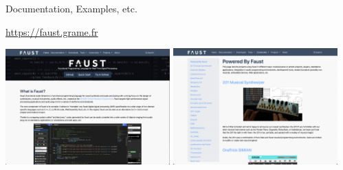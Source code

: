 
\begin{frame}[fragile]{Documentation, Examples, etc.}
    
    {\href{https://faust.grame.fr}{https://faust.grame.fr}}

    \begin{center}
        \href{https://faust.grame.fr}{\includegraphics[width=0.475\textwidth]{images/faust-website.png}}
        \href{https://faust.grame.fr/community/powered-by-faust/}{\includegraphics[width=0.475\textwidth]{images/powered-with-faust.png}}
    \end{center}
	
\end{frame}
